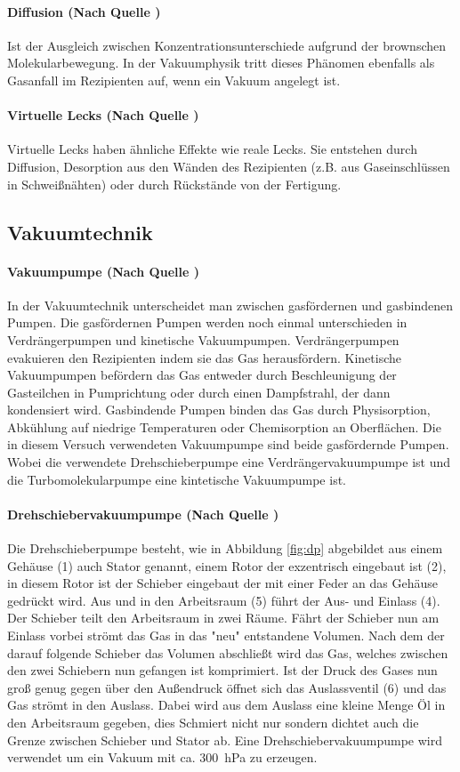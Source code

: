 \paragraph{Diffusion (Nach Quelle \cite{wiki:dif})}
Ist der Ausgleich zwischen Konzentrationsunterschiede aufgrund der brownschen Molekularbewegung. 
In der Vakuumphysik tritt dieses Phänomen ebenfalls als Gasanfall im Rezipienten auf, wenn 
ein Vakuum angelegt ist.
\paragraph{Virtuelle Lecks (Nach Quelle \cite{wiki:vl})}
Virtuelle Lecks haben ähnliche Effekte wie reale Lecks. Sie entstehen durch Diffusion, Desorption 
aus den Wänden des Rezipienten (z.B. aus Gaseinschlüssen in Schweißnähten) oder durch Rückstände 
von der Fertigung.

\subsection{Vakuumtechnik}
\paragraph{Vakuumpumpe (Nach Quelle \cite{pfeiffer})}
In der Vakuumtechnik unterscheidet man zwischen gasfördernen und gasbindenen Pumpen. Die 
gasfördernen Pumpen werden noch einmal unterschieden 
in Verdrängerpumpen und kinetische Vakuumpumpen. 
Verdrängerpumpen evakuieren den Rezipienten indem sie das Gas herausfördern. Kinetische 
Vakuumpumpen befördern das Gas entweder durch Beschleunigung der Gasteilchen in Pumprichtung oder 
durch einen Dampfstrahl, der dann kondensiert wird. Gasbindende Pumpen binden das Gas durch 
Physisorption, Abkühlung auf niedrige Temperaturen oder Chemisorption an Oberflächen.
Die in diesem Versuch verwendeten Vakuumpumpe sind beide gasfördernde Pumpen. Wobei 
die verwendete Drehschieberpumpe eine Verdrängervakuumpumpe ist und die Turbomolekularpumpe 
eine kintetische Vakuumpumpe ist.

\paragraph{Drehschiebervakuumpumpe (Nach Quelle \cite{pfeiffer})}
Die Drehschieberpumpe besteht, wie in Abbildung \ref{fig:dp} abgebildet aus einem Gehäuse (1) 
auch Stator genannt, einem 
Rotor der exzentrisch eingebaut ist (2), in diesem Rotor ist der Schieber eingebaut der mit einer 
Feder an das Gehäuse gedrückt wird. Aus und in den Arbeitsraum (5) führt der Aus- und Einlass (4). 
Der Schieber teilt den Arbeitsraum in zwei Räume. Fährt der Schieber nun am Einlass vorbei 
strömt das Gas in das "neu" entstandene Volumen. Nach dem der darauf folgende Schieber das Volumen 
abschließt wird das Gas, welches zwischen den zwei Schiebern nun gefangen ist komprimiert. 
Ist der Druck des Gases nun groß genug gegen über den Außendruck öffnet sich das Auslassventil (6) 
und das Gas strömt in den Auslass. Dabei wird aus dem Auslass eine kleine Menge Öl in den 
Arbeitsraum gegeben, dies Schmiert nicht nur sondern dichtet auch die Grenze zwischen Schieber und 
Stator ab. Eine Drehschiebervakuumpumpe wird verwendet um ein Vakuum mit ca. \SI{300}{\hecto\pascal} 
zu erzeugen.  


